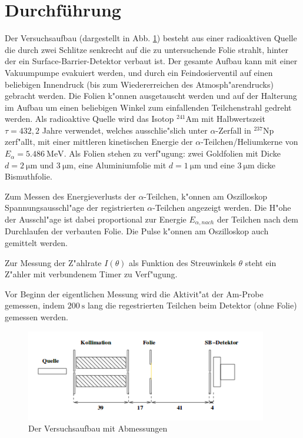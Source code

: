\section{Durchführung}
  \label{sec:Durchführung}
  Der Versuchsaufbau (dargestellt in Abb. \ref{fig:aufbau}) besteht aus einer radioaktiven Quelle die durch zwei Schlitze senkrecht auf die zu untersuchende Folie strahlt, hinter der ein Surface-Barrier-Detektor verbaut ist.
  Der gesamte Aufbau kann mit einer Vakuumpumpe evakuiert werden, und durch ein Feindosierventil auf einen beliebigen Innendruck (bis zum Wiedererreichen des Atmosph"arendrucks) gebracht werden.
  Die Folien k"onnen ausgetauscht werden und auf der Halterung im Aufbau um einen beliebigen Winkel zum einfallenden Teilchenstrahl gedreht werden.
  Als radioaktive Quelle wird das Isotop $^{241}\text{Am}$ mit Halbwertszeit $\tau=432,2$ Jahre verwendet, welches ausschlie"slich unter $\alpha$-Zerfall in $^{237}\text{Np}$ zerf"allt, mit einer mittleren kinetischen Energie der $\alpha$-Teilchen/Heliumkerne von $E_{\alpha}=\SI{5,486}{\mega \electronvolt}$.
  Als Folien stehen zu verf"ugung: zwei Goldfolien mit Dicke $d=\SI{2}{\micro \meter}$ und $\SI{3}{\micro \meter}$, eine Aluminiumfolie mit $d=\SI{1}{\micro \meter}$ und eine $\SI{3}{\micro \meter}$ dicke Bismuthfolie.

  Zum Messen des Energieverlusts der $\alpha$-Teilchen, k"onnen am Oszilloskop Spannungsausschl"age der registrierten  $\alpha$-Teilchen angezeigt werden. Die H"ohe der Ausschl"age ist dabei proportional zur Energie $E_{\alpha,nach}$ der Teilchen nach dem Durchlaufen der verbauten Folie.
  Die Pulse k"onnen am Oszilloskop auch gemittelt werden.

  Zur Messung der Z"ahlrate $I(\theta)$ als Funktion des Streuwinkels $\theta$ steht ein Z"ahler mit verbundenem Timer zu Verf"ugung.

  Vor Beginn der eigentlichen Messung wird die Aktivit"at der Am-Probe gemessen, indem $\SI{200}{\second}$ lang die regestrierten Teilchen beim Detektor (ohne Folie) gemessen werden.

  \begin{figure}
    \centering
    \includegraphics[height=4cm]{bilder/aufbau.png}
    \caption{Der Versuchsaufbau mit Abmessungen \cite{Anleitung}}
    \label{fig:aufbau}
  \end{figure}



